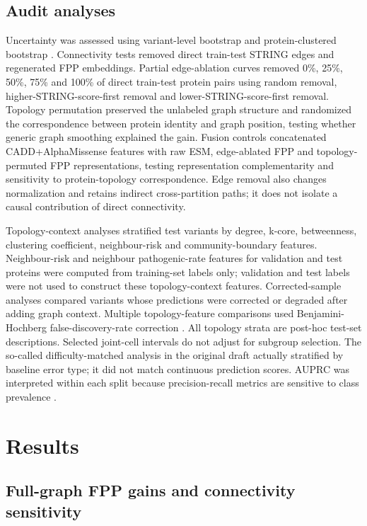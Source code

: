 \documentclass[conference]{IEEEtran}
\newcommand{\CADDAM}{CADD\allowbreak{}+\allowbreak{}AlphaMissense}
\begin{document}
\subsection{Audit analyses}

Uncertainty was assessed using variant-level bootstrap and protein-clustered bootstrap \cite{Efron1993Bootstrap}. Connectivity tests removed direct train-test STRING edges and regenerated FPP embeddings. Partial edge-ablation curves removed 0\%, 25\%, 50\%, 75\% and 100\% of direct train-test protein pairs using random removal, higher-STRING-score-first removal and lower-STRING-score-first removal. Topology permutation preserved the unlabeled graph structure and randomized the correspondence between protein identity and graph position, testing whether generic graph smoothing explained the gain. Fusion controls concatenated \CADDAM{} features with raw ESM, edge-ablated FPP and topology-permuted FPP representations, testing representation complementarity and sensitivity to protein-topology correspondence. Edge removal also changes normalization and retains indirect cross-partition paths; it does not isolate a causal contribution of direct connectivity.

Topology-context analyses stratified test variants by degree, k-core, betweenness, clustering coefficient, neighbour-risk and community-boundary features. Neighbour-risk and neighbour pathogenic-rate features for validation and test proteins were computed from training-set labels only; validation and test labels were not used to construct these topology-context features. Corrected-sample analyses compared variants whose predictions were corrected or degraded after adding graph context. Multiple topology-feature comparisons used Benjamini-Hochberg false-discovery-rate correction \cite{Benjamini1995FDR}. All topology strata are post-hoc test-set descriptions. Selected joint-cell intervals do not adjust for subgroup selection. The so-called difficulty-matched analysis in the original draft actually stratified by baseline error type; it did not match continuous prediction scores. AUPRC was interpreted within each split because precision-recall metrics are sensitive to class prevalence \cite{Saito2015PrecisionRecall}.

\section{Results}

\subsection{Full-graph FPP gains and connectivity sensitivity}
\end{document}
